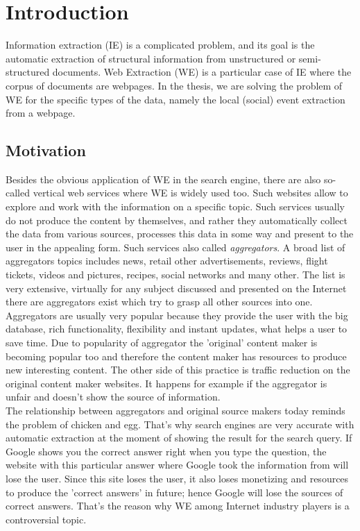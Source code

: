 \chapter{Introduction}
Information extraction (IE) is a complicated problem, and its goal is the automatic extraction of structural information from unstructured or semi-structured documents. Web Extraction (WE) is a particular case of IE where the corpus of documents are webpages. In the thesis, we are solving the problem of WE for the specific types of the data, namely the local (social) event extraction from a webpage.   


\section{Motivation}
Besides the obvious application of WE in the search engine, there are also so-called vertical web services where WE is widely used too. Such websites allow to explore and work with the information on a specific topic. Such services usually do not produce the content by themselves, and rather they automatically collect the data from various sources, processes this data in some way and present to the user in the appealing form. Such services also called \textit{aggregators}. A broad list of aggregators topics includes news, retail other advertisements, reviews, flight tickets, videos and pictures, recipes, social networks and many other. The list is very extensive, virtually for any subject discussed and presented on the Internet there are aggregators exist which try to grasp all other sources into one. \\

Aggregators are usually very popular because they provide the user with the big database, rich functionality, flexibility and instant updates, what helps a user to save time. Due to popularity of aggregator the 'original' content maker is becoming popular too and therefore the content maker has resources to produce new interesting content. The other side of this practice is traffic reduction on the original content maker websites. It happens for example if the aggregator is unfair and doesn't show the source of information. \\

The relationship between aggregators and original source makers today reminds the problem of chicken and egg. That's why search engines are very accurate with automatic extraction at the moment of showing the result for the search query. If Google shows you the correct answer right when you type the question, the website with this particular answer where Google took the information from will lose the user. Since this site loses the user, it also loses monetizing and resources to produce the 'correct answers' in future; hence Google will lose the sources of correct answers. That's the reason why WE among Internet industry players is a controversial topic.\\

